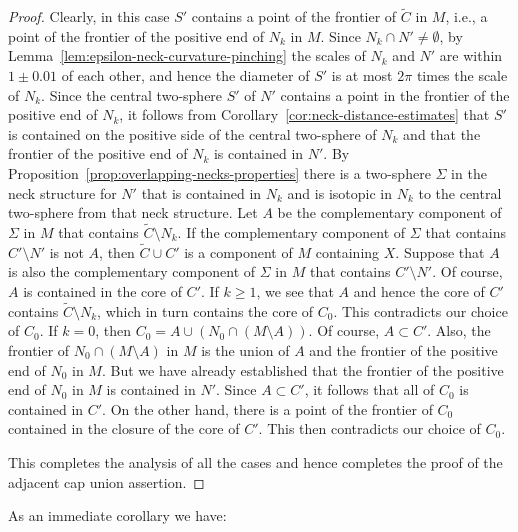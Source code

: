 \begin{proof}
 Clearly, in this case $S'$ contains a
point of the frontier of $\widetilde C$ in $M$, i.e., a point of the
frontier of the positive end of $N_k$ in $M$. Since $N_k\cap
N'\not=\emptyset$, by Lemma~\ref{lem:epsilon-neck-curvature-pinching} the scales of $N_k$ and
$N'$ are within $1\pm 0.01$ of each other, and hence the diameter of
$S'$ is at most $2\pi$ times the scale of $N_k$. Since the central
two-sphere $S'$ of $N'$ contains a point in the frontier of the
positive end of $N_k$, it follows from Corollary~\ref{cor:neck-distance-estimates} that $S'$
is contained on the positive side  of the central two-sphere of
$N_k$ and that the frontier of the positive end of $N_k$ is
contained in $N'$. By Proposition~\ref{prop:overlapping-necks-properties} there is a
two-sphere $\Sigma$ in the neck structure for $N'$ that is contained
in $N_k$ and is isotopic in $N_k$ to the central two-sphere from
that neck structure. Let $A$ be the complementary component of
$\Sigma$ in $M$ that contains $\widetilde C\setminus N_k$.
 If the complementary component of $\Sigma$ that contains
$C'\setminus N'$ is not $A$, then $\widetilde C\cup C'$ is a
component of $M$ containing $X$. Suppose that $A$ is also the
complementary component of $\Sigma$ in $M$ that contains
$C'\setminus N'$. Of course, $A$ is contained in the core of $C'$.
If $k\ge 1$, we see that $A$ and hence the core of $C'$ contains
$\widetilde C\setminus N_k$, which in turn contains the core of
$C_0$. This contradicts our choice of $C_0$. If $k=0$, then
$C_0=A\cup (N_0\cap (M\setminus A))$. Of course, $A\subset C'$.
Also, the frontier of $N_0\cap(M\setminus A)$ in $M$ is the union of
$A$ and the frontier of the positive end of $N_0$ in $M$. But we
have already established that the frontier of the positive end of
$N_0$ in $M$ is contained in $N'$. Since $A\subset C'$, it follows
that all of $C_0$ is contained in $C'$. On the other hand, there is
a point of the frontier of $C_0$ contained in the closure of the
core of $C'$. This then contradicts our choice of $C_0$.

 This
completes the analysis of all the cases and hence completes the
proof of the adjacent cap union assertion.
\end{proof}


As an immediate corollary we have:


